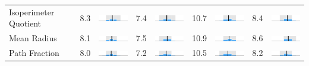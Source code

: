 \begin{table}
\begin{tabular}{l rm{7em} rm{7em} rm{7em} rm{7em}}
Isoperimeter Quotient  &   8.3 &       \includegraphics[width=7em]{mini_hist/PA_2000_polsby} &   7.4 &       \includegraphics[width=7em]{mini_hist/PA_2004_polsby} &  10.7 &       \includegraphics[width=7em]{mini_hist/PA_2008_polsby} &   8.4 &       \includegraphics[width=7em]{mini_hist/PA_2012_polsby} \\
Mean Radius            &   8.1 &  \includegraphics[width=7em]{mini_hist/PA_2000_mean_radius} &   7.5 &  \includegraphics[width=7em]{mini_hist/PA_2004_mean_radius} &  10.9 &  \includegraphics[width=7em]{mini_hist/PA_2008_mean_radius} &   8.6 &  \includegraphics[width=7em]{mini_hist/PA_2012_mean_radius} \\
Path Fraction          &   8.0 &    \includegraphics[width=7em]{mini_hist/PA_2000_path_frac} &   7.2 &    \includegraphics[width=7em]{mini_hist/PA_2004_path_frac} &  10.5 &    \includegraphics[width=7em]{mini_hist/PA_2008_path_frac} &   8.2 &    \includegraphics[width=7em]{mini_hist/PA_2012_path_frac} \\

\end{tabular}
\end{table}
